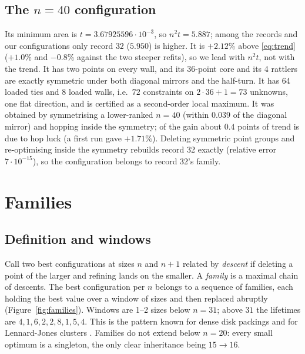 \documentclass[11pt]{amsart}
\theoremstyle{definition}
\begin{document}
\subsection{The \texorpdfstring{$n = 40$}{n = 40} configuration}\label{sec:n40}
Its minimum area is $t = 3.67925596\cdot10^{-3}$, so $n^2t = 5.887$; among the records and our configurations only record $32$ ($5.950$) is higher. It is $+2.12\%$ above \eqref{eq:trend} ($+1.0\%$ and $-0.8\%$ against the two steeper refits), so we lead with $n^2t$, not with the trend. %
It has two points on every wall, and its 36-point core and its 4 rattlers are exactly symmetric under both diagonal mirrors and the half-turn. It has 64 loaded ties and 8 loaded walls, i.e.\ $72$ constraints on $2\cdot36+1 = 73$ unknowns, one flat direction, and is certified as a second-order local maximum. %
It was obtained by symmetrising a lower-ranked $n = 40$ (within $0.039$ of the diagonal mirror) and hopping inside the symmetry; of the gain about $0.4$ points of trend is due to hop luck (a first run gave $+1.71\%$). %
Deleting symmetric point groups and re-optimising inside the symmetry rebuilds record 32 exactly (relative error $7\cdot10^{-15}$), so the configuration belongs to record 32's family. %

\section{Families}\label{sec:families}

\subsection{Definition and windows}
Call two best configurations at sizes $n$ and $n+1$ related by \emph{descent} if deleting a point of the larger and refining lands on the smaller. A \emph{family} is a maximal chain of descents. The best configuration per $n$ belongs to a sequence of families, each holding the best value over a window of sizes and then replaced abruptly (Figure~\ref{fig:families}). Windows are 1--2 sizes below $n = 31$; above $31$ the lifetimes are $4, 1, 6, 2, 2, 8, 1, 5, 4$. %
This is the pattern known for dense disk packings \cite{GL} and for Lennard-Jones clusters \cite{WD,DMW}. Families do not extend below $n = 20$: every small optimum is a singleton, the only clear inheritance being $15 \to 16$. %
\end{document}
